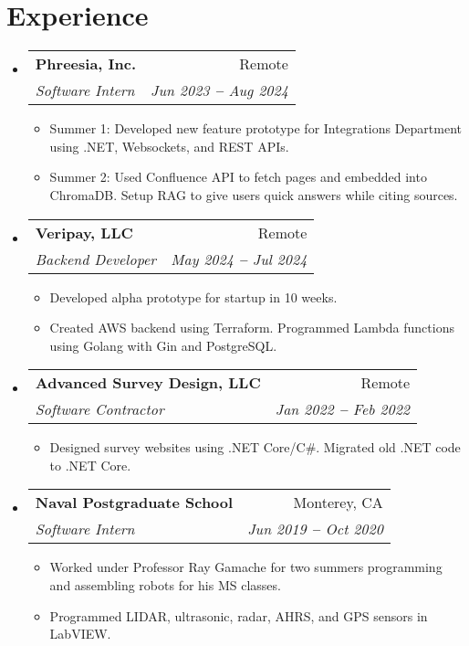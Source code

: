 \documentclass[12pt]{article}
\makeatletter
\newcommand{\entry}[1]{
  \item\small{
    {#1 \vspace{-2pt}}
  }
}
\newcommand{\subheading}[4]{
  \vspace{-2pt}\item
    \begin{tabular*}{0.97\textwidth}[t]{l@{\extracolsep{\fill}}r}
      \textbf{#1} & #2 \\
      \textit{\small#3} & \textit{\small #4} \\
    \end{tabular*}\vspace{-7pt}
}
\newcommand{\subheadingliststart}{\begin{itemize}[leftmargin=0.15in, label={}]}
\newcommand{\subheadinglistend}{\end{itemize}}
\newcommand{\entryliststart}{\begin{itemize}}
\newcommand{\entrylistend}{\end{itemize}\vspace{-5pt}}
\makeatother
\begin{document}
\section{Experience}
  \vspace{3pt}
  \subheadingliststart
    \subheading
      {Phreesia, Inc.}{Remote}
      {Software Intern}{Jun 2023 \textbf{--} Aug 2024}
        \entryliststart
            \entry{Summer 1: Developed new feature prototype for Integrations Department using .NET, Websockets, and REST APIs.}
            \entry{Summer 2: Used Confluence API to fetch pages and embedded into ChromaDB. Setup RAG to give users quick answers while citing sources.}
        \entrylistend
    \subheading
      {Veripay, LLC}{Remote}
      {Backend Developer}{May 2024 \textbf{--} Jul 2024}
        \entryliststart
            \entry{Developed alpha prototype for startup in 10 weeks.}
            \entry{Created AWS backend using Terraform. Programmed Lambda functions using Golang with Gin and PostgreSQL.}
        \entrylistend
    \subheading
      {Advanced Survey Design, LLC}{Remote}
      {Software Contractor}{Jan 2022 \textbf{--} Feb 2022}
        \entryliststart
            \entry{Designed survey websites using .NET Core/C\#. Migrated old .NET code to .NET Core.}
        \entrylistend
    \subheading
      {Naval Postgraduate School}{Monterey, CA}
      {Software Intern}{Jun 2019 \textbf{--} Oct 2020}
        \entryliststart
            \entry{Worked under Professor Ray Gamache for two summers programming and assembling robots for his MS classes.}
            \entry{Programmed LIDAR, ultrasonic, radar, AHRS, and GPS sensors in LabVIEW.}
        \entrylistend
  \subheadinglistend
\end{document}
